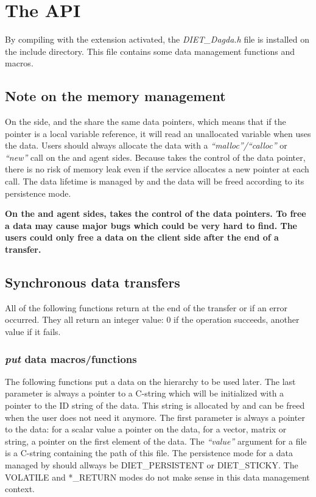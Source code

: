 \section{The \dagda API}
By compiling \diet with the \dagda extension activated, the
\textit{DIET\_Dagda.h} file is installed on the \diet include
directory.  This file contains some data management functions and
macros.
\subsection{Note on the memory management}
On the \sed side, \dagda and the \sed share the same data pointers, which
means that if the pointer is a local variable reference, it will read an unallocated variable when \dagda
uses the data. Users
should always allocate the data with a \textit{``malloc''/``calloc''} or
\textit{``new''} call on the \sed and agent sides. Because \dagda takes
the control of the data pointer, there is no risk of memory leak even
if the service allocates a new pointer at each call. The data lifetime
is managed by \dagda and the data will be freed according to its
persistence mode.\\[4mm]
\begin{minipage}{2cm}
  \centering
  \textbf{{\Huge \Biohazard}}
\end{minipage}
\begin{minipage}{\textwidth - 2cm}
\textbf{On the \sed and agent sides, \dagda takes the control of the data
pointers. To free a data may cause major bugs which could be very hard to
find. The users could only free a \diet data on the client side after the end of
a transfer.}
\end{minipage}

\subsection{Synchronous data transfers}
All of the following functions return at the end of the transfer or
if an error occurred. They all return an integer value: 0 if the
operation succeeds, another value if it fails.

\subsubsection{\dagda \textit{put} data macros/functions}
\label{sec:syncPutFunctions}
The following functions put a data on the \dagda hierarchy to be used
later.  The last parameter is always a pointer to a C-string which
will be initialized with a pointer to the ID string of the data. This
string is allocated by \dagda and can be freed when the user does not
need it anymore.  The first parameter is always a pointer to the
data: for a scalar value a pointer on the data, for a vector, matrix
or string, a pointer on the first element of the data. The
\textit{``value''} argument for a file is a C-string containing the path
of this file. The persistence mode for a data managed by \dagda should
allways be DIET\_PERSISTENT or DIET\_STICKY.  The VOLATILE and
*\_RETURN modes do not make sense in this data management context.

